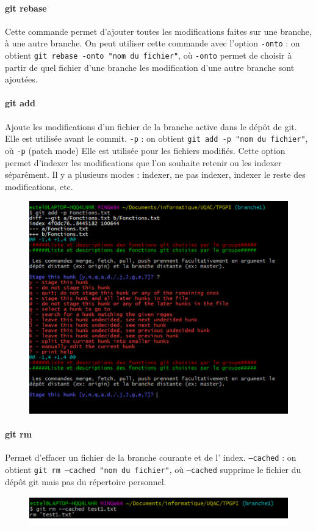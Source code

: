 \documentclass[11pt,canadien]{article}
\begin{document}
\paragraph{git rebase}Cette commande permet d'ajouter toutes les modifications faites sur une branche, à une autre branche. On peut utiliser cette commande avec l'option \texttt{-onto} : on obtient \texttt{git rebase -onto "nom du fichier"}, où \texttt{-onto} permet de choisir à partir de quel fichier d'une branche les modification d'une autre branche sont ajoutées.

\paragraph{git add}Ajoute les modifications d’un fichier de la branche active dans le dépôt de git. Elle est utilisée avant le commit. \texttt{-p} : on obtient \texttt{git add -p "nom du fichier"}, où \texttt{-p} (patch mode) Elle est utilisée pour les fichiers modifiés. Cette option permet d’indexer les modifications que l’on souhaite retenir ou les indexer séparément. Il y a plusieurs modes : indexer, ne pas indexer, indexer le reste des modifications, etc.
\begin{figure}[H]
	\centering
	\includegraphics{images/git_add_-p}
\end{figure}

\paragraph{git rm}Permet d’effacer un fichier de la branche courante et de l’ index. \texttt{--cached} : on obtient \texttt{git rm --cached "nom du fichier"}, où \texttt{--cached} supprime le fichier du dépôt git mais pas du répertoire personnel.
\begin{figure}[H]
	\centering
	\includegraphics{images/git_rm_--cached.png}
\end{figure}
\end{document}
